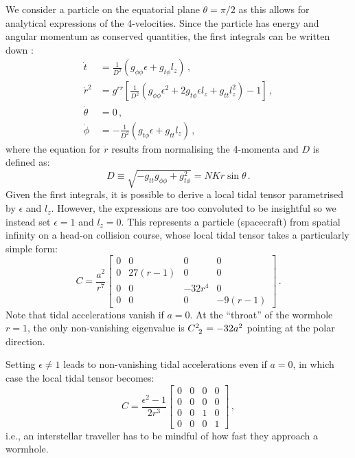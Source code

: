 \documentclass[
    reprint,
    prd,
    nofootinbib,
    amsmath,amssymb,
    aps,
    floatfix,
]{revtex4-2}
\begin{document}
We consider a particle on the equatorial plane $\theta = \pi/2$ as this allows for analytical expressions of the 4-velocities. Since the particle has energy and angular momentum as conserved quantities, the first integrals can be written down \cite{Teo1998}:
\begin{equation}
    \begin{split}
        \dot{t} &= \frac{1}{D^{2}} (g_{\phi\phi} \epsilon + g_{t\phi} l_{z}) \, , \\
        \dot{r}^{2} &= g^{rr} \left[ \frac{1}{D^{2}} (g_{\phi\phi} \epsilon^{2} + 2g_{t\phi} \epsilon l_{z} + g_{tt} l_{z}^{2}) - 1 \right] \, , \\
        \dot{\theta} &= 0 \, , \\
        \dot{\phi} &= -\frac{1}{D^{2}} (g_{t\phi} \epsilon + g_{tt} l_{z}) \, ,
    \end{split}
\end{equation}
where the equation for $\dot{r}$ results from normalising the 4-momenta and $D$ is defined as:
\begin{equation}
    D \equiv \sqrt{-g_{tt} g_{\phi\phi} + g_{t\phi}^{2}} = NKr\sin{\theta} \, .
\end{equation}
Given the first integrals, it is possible to derive a local tidal tensor parametrised by $\epsilon$ and $l_{z}$. However, the expressions are too convoluted to be insightful so we instead set $\epsilon = 1$ and $l_{z} = 0$. This represents a particle (spacecraft) from spatial infinity on a head-on collision course, whose local tidal tensor takes a particularly simple form:
\begin{equation}
    C =
    \frac{a^{2}}{r^{7}}
    \begin{bmatrix}
        0 & 0         & 0        & 0         \\
        0 & 27(r - 1) & 0        & 0         \\
        0 & 0         & -32r^{4} & 0         \\
        0 & 0         & 0        & -9(r - 1)
    \end{bmatrix} \, .
\end{equation}
Note that tidal accelerations vanish if $a = 0$. At the ``throat'' of the wormhole $r = 1$, the only non-vanishing eigenvalue is $\tensor{C}{^{2}_{2}} = -32a^{2}$ pointing at the polar direction.

Setting $\epsilon \neq 1$ leads to non-vanishing tidal accelerations even if $a = 0$, in which case the local tidal tensor becomes:
\begin{equation}
    C =
    \frac{\epsilon^{2} - 1}{2r^{3}}
    \begin{bmatrix}
        0 & 0 & 0 & 0 \\
        0 & 0 & 0 & 0 \\
        0 & 0 & 1 & 0 \\
        0 & 0 & 0 & 1
    \end{bmatrix} \, ,
\end{equation}
i.e., an interstellar traveller has to be mindful of how fast they approach a wormhole.
\end{document}
